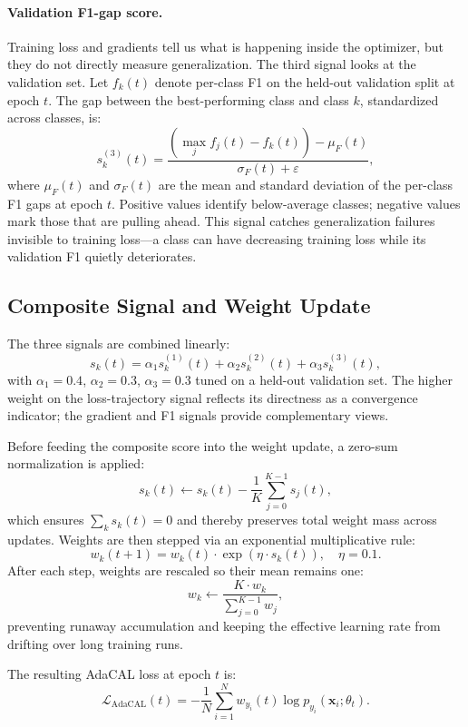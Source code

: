 \documentclass[letterpaper]{article}
\begin{document}
\paragraph{Validation F1-gap score.}
Training loss and gradients tell us what is happening inside the optimizer, but they do not directly measure generalization. The third signal looks at the validation set. Let $f_k(t)$ denote per-class F1 on the held-out validation split at epoch $t$. The gap between the best-performing class and class $k$, standardized across classes, is:
$$s^{(3)}_k(t) = \frac{\left(\max_j f_j(t) - f_k(t)\right) - \mu_F(t)}{\sigma_F(t) + \varepsilon},$$
where $\mu_F(t)$ and $\sigma_F(t)$ are the mean and standard deviation of the per-class F1 gaps at epoch $t$. Positive values identify below-average classes; negative values mark those that are pulling ahead. This signal catches generalization failures invisible to training loss---a class can have decreasing training loss while its validation F1 quietly deteriorates.

\subsection{Composite Signal and Weight Update}

The three signals are combined linearly:
$$s_k(t) = \alpha_1 s^{(1)}_k(t) + \alpha_2 s^{(2)}_k(t) + \alpha_3 s^{(3)}_k(t),$$
with $\alpha_1 = 0.4$, $\alpha_2 = 0.3$, $\alpha_3 = 0.3$ tuned on a held-out validation set. The higher weight on the loss-trajectory signal reflects its directness as a convergence indicator; the gradient and F1 signals provide complementary views.

Before feeding the composite score into the weight update, a zero-sum normalization is applied:
$$s_k(t) \leftarrow s_k(t) - \frac{1}{K} \sum_{j=0}^{K-1} s_j(t),$$
which ensures $\sum_k s_k(t) = 0$ and thereby preserves total weight mass across updates. Weights are then stepped via an exponential multiplicative rule:
$$w_k(t+1) = w_k(t) \cdot \exp\!\left(\eta \cdot s_k(t)\right), \quad \eta = 0.1.$$
After each step, weights are rescaled so their mean remains one:
$$w_k \leftarrow \frac{K \cdot w_k}{\sum_{j=0}^{K-1} w_j},$$
preventing runaway accumulation and keeping the effective learning rate from drifting over long training runs.

The resulting AdaCAL loss at epoch $t$ is:
$$\mathcal{L}_\text{AdaCAL}(t) = -\frac{1}{N} \sum_{i=1}^N w_{y_i}(t) \log p_{y_i}(\mathbf{x}_i; \theta_t).$$
\end{document}
